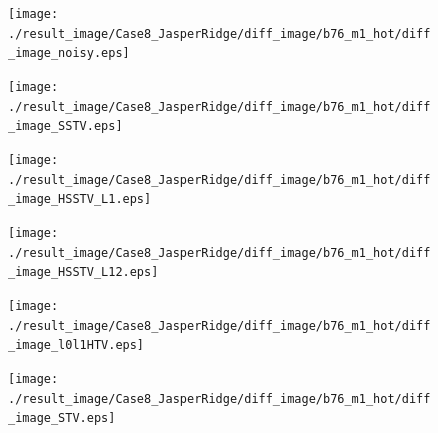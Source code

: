 \begin{figure}[t]
\begin{center}
		\begin{minipage}{0.125\hsize}
			\centerline{\hspace{\hsize}} %
		\end{minipage}
		\begin{minipage}{0.125\hsize}
			\centerline{\texttt{[image: ./result\_image/Case8\_JasperRidge/diff\_image/b76\_m1\_hot/diff\_image\_noisy.eps]}} %
		\end{minipage}
		\begin{minipage}{0.125\hsize}
			\centerline{\texttt{[image: ./result\_image/Case8\_JasperRidge/diff\_image/b76\_m1\_hot/diff\_image\_SSTV.eps]}} %
		\end{minipage}
		\begin{minipage}{0.125\hsize}
			\centerline{\texttt{[image: ./result\_image/Case8\_JasperRidge/diff\_image/b76\_m1\_hot/diff\_image\_HSSTV\_L1.eps]}} %
		\end{minipage}
		\begin{minipage}{0.125\hsize}
			\centerline{\texttt{[image: ./result\_image/Case8\_JasperRidge/diff\_image/b76\_m1\_hot/diff\_image\_HSSTV\_L12.eps]}} %
		\end{minipage}
		\begin{minipage}{0.125\hsize}
			\centerline{\texttt{[image: ./result\_image/Case8\_JasperRidge/diff\_image/b76\_m1\_hot/diff\_image\_l0l1HTV.eps]}} %
		\end{minipage}
		\begin{minipage}{0.125\hsize}
			\centerline{\texttt{[image: ./result\_image/Case8\_JasperRidge/diff\_image/b76\_m1\_hot/diff\_image\_STV.eps]}} %
		\end{minipage}
		\begin{minipage}{0.050\hsize}

\end{minipage}
\end{center}
\end{figure}
